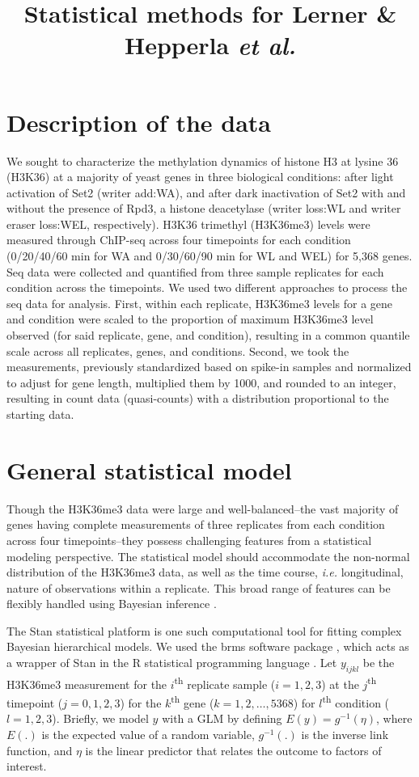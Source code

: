 \documentclass[12pt]{extarticle}
\title{Statistical methods for Lerner \& Hepperla \textit{et al.}}
\date{}
\newcommand{\ie}{\emph{i.e.}\xspace}
\begin{document}
\maketitle

\section*{Description of the data}
We sought to characterize the methylation dynamics of histone H3 at lysine 36 (H3K36) at a majority of yeast genes in three biological conditions: after light activation of Set2 (writer add:WA), and after dark inactivation of Set2 with and without the presence of Rpd3, a histone deacetylase (writer loss:WL and writer eraser loss:WEL, respectively). H3K36 trimethyl (H3K36me3) levels were measured through ChIP-seq across four timepoints for each condition (0/20/40/60 min for WA and 0/30/60/90 min for WL and WEL) for 5,368 genes. Seq data were collected and quantified from three sample replicates for each condition across the timepoints. We used two different approaches to process the seq data for analysis. First, within each replicate, H3K36me3 levels for a gene and condition were scaled to the proportion of maximum H3K36me3 level observed (for said replicate, gene, and condition), resulting in a common quantile scale across all replicates, genes, and conditions. Second, we took the measurements, previously standardized based on spike-in samples and normalized to adjust for gene length, multiplied them by 1000, and rounded to an integer, resulting in count data (quasi-counts) with a distribution proportional to the starting data. 

\section*{General statistical model}
Though the H3K36me3 data were large and well-balanced--the vast majority of genes having complete measurements of three replicates from each condition across four timepoints--they possess challenging features from a statistical modeling perspective. The statistical model should accommodate the non-normal distribution of the H3K36me3 data, as well as the time course, \ie longitudinal, nature of observations within a replicate. This broad range of features can be flexibly handled using Bayesian inference \cite{Gelman2006, Gelman2013}. 
	
The Stan statistical platform \cite{Carpenter2017} is one such computational tool for fitting complex Bayesian hierarchical models. We used the brms software package \cite{Burkner2017, Burkner2018}, which acts as a wrapper of Stan in the R statistical programming language \cite{RCoreTeam2019}. Let $y_{ijkl}$ be the H3K36me3 measurement for the $i$\textsuperscript{th} replicate sample ($i=1,2,3$) at the $j$\textsuperscript{th} timepoint ($j=0,1,2,3$) for the $k$\textsuperscript{th} gene ($k=1,2,…,5368$) for $l$\textsuperscript{th} condition ($l=1,2,3$). Briefly, we model $y$ with a GLM by defining $E(y)=g^{-1}(\eta)$, where $E(.)$ is the expected value of a random variable, $g^{-1}(.)$ is the inverse link function, and $\eta$ is the linear predictor that relates the outcome to factors of interest.
	
\end{document}
